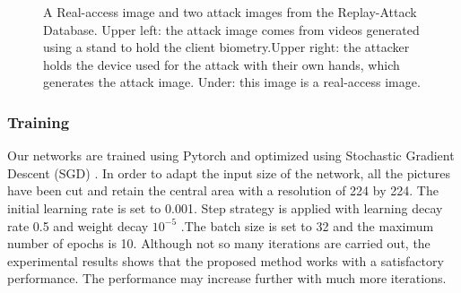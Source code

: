 \documentclass[journal]{IEEEtran}
\begin{document}
\begin{figure}[!t]
	\centering
	\caption{A Real-access image and two attack images from the Replay-Attack Database. Upper left: the attack image comes from  videos generated using a stand to hold the client biometry.Upper right: the attacker holds the device used for the attack with their own hands, which generates the attack image. Under: this image is a real-access image.}
	\label{fig_EX_123}
\end{figure}

\subsubsection*{\textbf{Training}}
Our networks are trained using Pytorch and optimized using Stochastic Gradient Descent (SGD) . In order to adapt the input size of the network, all the pictures have been cut and retain the central area with a resolution of 224 by 224. The initial learning rate is set to 0.001. Step strategy is applied with learning decay rate 0.5 and weight decay $10^{-5}$ .The batch size is set to 32 and the maximum number of epochs is 10. Although not so many iterations are carried out, the experimental results shows that the proposed method works with a satisfactory performance. The performance may increase further with much more iterations. 
\end{document}
